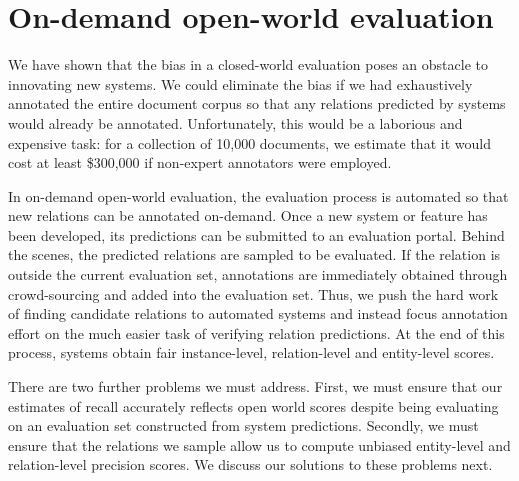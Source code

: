 \section{On-demand open-world evaluation}
\label{sec:methodology}

We have shown that the bias in a closed-world evaluation poses an obstacle to innovating new systems.
We could eliminate the bias if we had exhaustively annotated the entire document corpus so that any relations predicted by systems would already be annotated.
Unfortunately, this would be a laborious and expensive task: for a collection of 10,000 documents, we estimate that it would cost at least \$300,000 if non-expert annotators were employed.

In on-demand open-world evaluation, the evaluation process is automated so that new relations can be annotated on-demand.
Once a new system or feature has been developed, its predictions can be submitted to an evaluation portal.
Behind the scenes, the predicted relations are sampled to be evaluated.
If the relation is outside the current evaluation set, annotations are immediately obtained through crowd-sourcing and added into the evaluation set.
Thus, we push the hard work of finding candidate relations to automated systems and instead focus annotation effort on the much easier task of verifying relation predictions.
At the end of this process, systems obtain fair instance-level, relation-level and entity-level scores.

There are two further problems we must address. %
First, we must ensure that our estimates of recall accurately reflects open world scores despite being evaluating on an evaluation set constructed from system predictions.
Secondly, we must ensure that the relations we sample allow us to compute unbiased entity-level and relation-level precision scores.
We discuss our solutions to these problems next.


